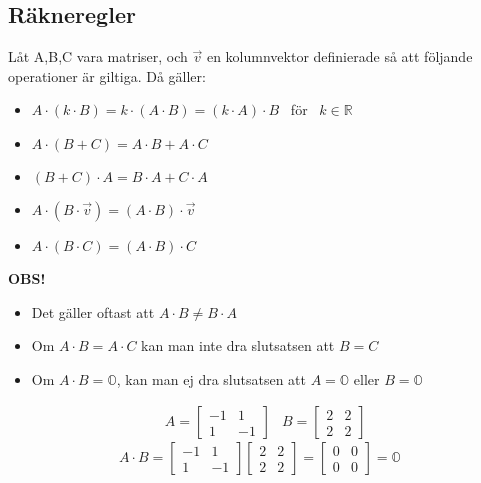 \subsection{Räkneregler} %
\label{sub:r_kneregler}
Låt A,B,C vara matriser, och $\vec{v}$ en kolumnvektor definierade så att följande operationer är giltiga. Då gäller:
\begin{itemize}
	\item $A \cdot (k \cdot B) = k \cdot (A \cdot B) = (k \cdot A) \cdot B$ \mbox{ för } $k \in \mathbb{R}$
	\item $A \cdot (B + C) = A \cdot B + A \cdot C$
	\item $(B + C) \cdot A = B \cdot A + C \cdot A$
	\item $A \cdot (B \cdot \vec{v}) = (A \cdot B) \cdot \vec{v}$
	\item $A \cdot (B \cdot C) = (A \cdot B) \cdot C$
\end{itemize}
\begin{Rem}
\textbf{   OBS!}
    \begin{itemize}
    	\item Det gäller oftast att $A \cdot B \neq B \cdot A$
    	\item Om $A \cdot B = A \cdot C$ kan man inte dra slutsatsen att $B = C$
    	\item Om $A \cdot B = \mathbb{O}$, kan man ej dra slutsatsen att $A = \mathbb{O}$ eller $B = \mathbb{O}$
    \end{itemize}
\end{Rem}
\newpage
\begin{Ex}
    \begin{align*}
    &A = \begin{bmatrix} -1&1\\1&-1 \end{bmatrix} &B = \begin{bmatrix} 2&2\\2&2 \end{bmatrix}
    \end{align*}
    \[
        A \cdot B = \begin{bmatrix} -1&1\\1&-1 \end{bmatrix}\begin{bmatrix} 2&2\\2&2 \end{bmatrix} = \begin{bmatrix} 0&0\\0&0 \end{bmatrix} = \mathbb{O}
    \]
\end{Ex}
